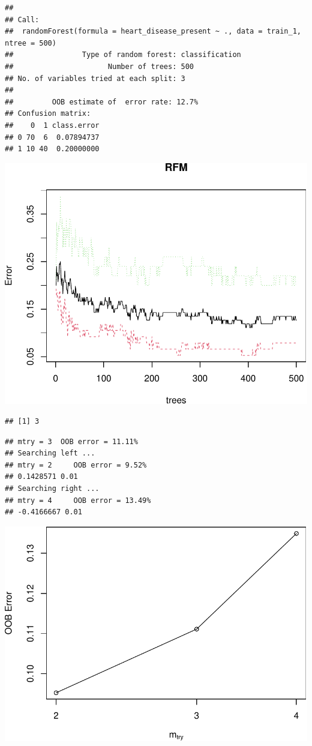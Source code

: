 \documentclass[11pt,preprint, authoryear]{elsarticle}
\numberwithin{equation}{section}
\numberwithin{figure}{section}
\numberwithin{table}{section}
\begin{document}
\begin{verbatim}
## 
## Call:
##  randomForest(formula = heart_disease_present ~ ., data = train_1,      ntree = 500) 
##                Type of random forest: classification
##                      Number of trees: 500
## No. of variables tried at each split: 3
## 
##         OOB estimate of  error rate: 12.7%
## Confusion matrix:
##    0  1 class.error
## 0 70  6  0.07894737
## 1 10 40  0.20000000
\end{verbatim}

\includegraphics{ML_project_files/figure-latex/unnamed-chunk-5-1.pdf}

\begin{verbatim}
## [1] 3
\end{verbatim}

\begin{verbatim}
## mtry = 3  OOB error = 11.11% 
## Searching left ...
## mtry = 2     OOB error = 9.52% 
## 0.1428571 0.01 
## Searching right ...
## mtry = 4     OOB error = 13.49% 
## -0.4166667 0.01
\end{verbatim}

\includegraphics{ML_project_files/figure-latex/unnamed-chunk-7-1.pdf}
\end{document}
